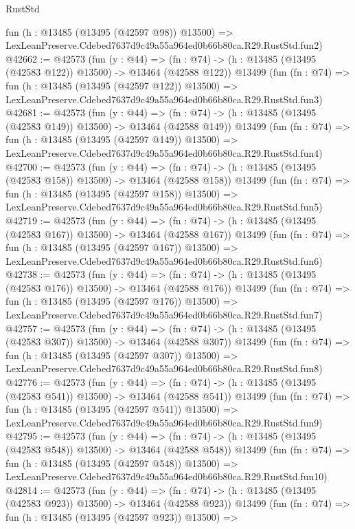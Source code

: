 \begin{lexlean}{RustStd}
\begin{coremodule}
    fun (h : @13485 (@13495 (@42597 @98)) @13500) =>
    LexLeanPreserve.Cdebed7637d9c49a55a964ed0b66b80ca.R29.RustStd.fun2)
@42662 := @42573
    (fun (y : @44) =>
    (fn : @74) -> (h : @13485 (@13495 (@42583 @122)) @13500) -> @13464 (@42588 @122))
    @13499
    (fun (fn : @74) =>
    fun (h : @13485 (@13495 (@42597 @122)) @13500) =>
    LexLeanPreserve.Cdebed7637d9c49a55a964ed0b66b80ca.R29.RustStd.fun3)
@42681 := @42573
    (fun (y : @44) =>
    (fn : @74) -> (h : @13485 (@13495 (@42583 @149)) @13500) -> @13464 (@42588 @149))
    @13499
    (fun (fn : @74) =>
    fun (h : @13485 (@13495 (@42597 @149)) @13500) =>
    LexLeanPreserve.Cdebed7637d9c49a55a964ed0b66b80ca.R29.RustStd.fun4)
@42700 := @42573
    (fun (y : @44) =>
    (fn : @74) -> (h : @13485 (@13495 (@42583 @158)) @13500) -> @13464 (@42588 @158))
    @13499
    (fun (fn : @74) =>
    fun (h : @13485 (@13495 (@42597 @158)) @13500) =>
    LexLeanPreserve.Cdebed7637d9c49a55a964ed0b66b80ca.R29.RustStd.fun5)
@42719 := @42573
    (fun (y : @44) =>
    (fn : @74) -> (h : @13485 (@13495 (@42583 @167)) @13500) -> @13464 (@42588 @167))
    @13499
    (fun (fn : @74) =>
    fun (h : @13485 (@13495 (@42597 @167)) @13500) =>
    LexLeanPreserve.Cdebed7637d9c49a55a964ed0b66b80ca.R29.RustStd.fun6)
@42738 := @42573
    (fun (y : @44) =>
    (fn : @74) -> (h : @13485 (@13495 (@42583 @176)) @13500) -> @13464 (@42588 @176))
    @13499
    (fun (fn : @74) =>
    fun (h : @13485 (@13495 (@42597 @176)) @13500) =>
    LexLeanPreserve.Cdebed7637d9c49a55a964ed0b66b80ca.R29.RustStd.fun7)
@42757 := @42573
    (fun (y : @44) =>
    (fn : @74) -> (h : @13485 (@13495 (@42583 @307)) @13500) -> @13464 (@42588 @307))
    @13499
    (fun (fn : @74) =>
    fun (h : @13485 (@13495 (@42597 @307)) @13500) =>
    LexLeanPreserve.Cdebed7637d9c49a55a964ed0b66b80ca.R29.RustStd.fun8)
@42776 := @42573
    (fun (y : @44) =>
    (fn : @74) -> (h : @13485 (@13495 (@42583 @541)) @13500) -> @13464 (@42588 @541))
    @13499
    (fun (fn : @74) =>
    fun (h : @13485 (@13495 (@42597 @541)) @13500) =>
    LexLeanPreserve.Cdebed7637d9c49a55a964ed0b66b80ca.R29.RustStd.fun9)
@42795 := @42573
    (fun (y : @44) =>
    (fn : @74) -> (h : @13485 (@13495 (@42583 @548)) @13500) -> @13464 (@42588 @548))
    @13499
    (fun (fn : @74) =>
    fun (h : @13485 (@13495 (@42597 @548)) @13500) =>
    LexLeanPreserve.Cdebed7637d9c49a55a964ed0b66b80ca.R29.RustStd.fun10)
@42814 := @42573
    (fun (y : @44) =>
    (fn : @74) -> (h : @13485 (@13495 (@42583 @923)) @13500) -> @13464 (@42588 @923))
    @13499
    (fun (fn : @74) =>
    fun (h : @13485 (@13495 (@42597 @923)) @13500) =>

\end{coremodule}
\end{lexlean}
